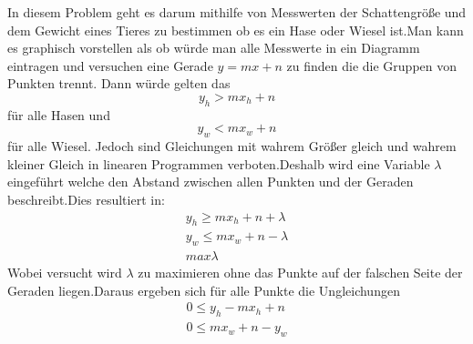 In diesem Problem geht es darum mithilfe von Messwerten der Schattengröße und dem Gewicht eines Tieres zu bestimmen ob es ein Hase oder Wiesel ist.Man kann es graphisch vorstellen als ob würde man alle Messwerte in ein Diagramm eintragen und versuchen eine Gerade $y=mx+n$ zu finden die die Gruppen von Punkten trennt.
Dann würde gelten das \[y_h>mx_h+n\] für alle Hasen und \[
y_w<mx_w+n\] für alle Wiesel. Jedoch sind Gleichungen mit wahrem Größer gleich und wahrem kleiner Gleich in linearen Programmen verboten.Deshalb wird eine Variable $\lambda$ eingeführt welche den Abstand zwischen allen Punkten und der Geraden beschreibt.Dies resultiert in:
\begin{align*}
	y_h\geq{}mx_h+n+\lambda\\
	y_w\leq{}mx_w+n-\lambda\\
	max{\lambda}
\end{align*} 
Wobei versucht wird $\lambda$ zu maximieren ohne das Punkte auf der falschen Seite der Geraden liegen.Daraus ergeben sich für alle Punkte die Ungleichungen 
\begin{align*}
	0 \leq{} y_h-mx_h+n\\
	0\leq{}mx_w+n -y_w
\end{align*} 
